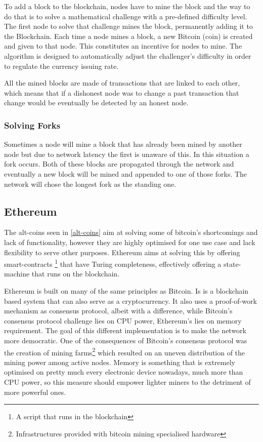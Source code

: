 \documentclass[llncsdoc]{llncs}
\begin{document}
 To add a block to the blockchain, nodes have to mine the block and the way to do that is to solve a mathematical challenge with a pre-defined difficulty level. The first node to solve that challenge mines the block, permanently adding it to the Blockchain. Each time a node mines a block, a new Bitcoin (coin) is created and given to that node. This constitutes an incentive for nodes to mine. The algorithm is designed to automatically adjust the challenger's difficulty in order to regulate the currency issuing rate.
 
 All the mined blocks are made of transactions that are linked to each other, which means that if a dishonest node was to change a past transaction that change would be eventually be detected by an honest node.
 
 
\subsubsection{Solving Forks}
Sometimes a node will mine a block that has already been mined by another node but due to network latency the first is unaware of this. In this situation a fork occurs. Both of these blocks are propagated through the network and eventually a new block will be mined and appended to one of those forks. The network will chose the longest fork as the standing one.

\subsection{Ethereum}
The alt-coins seen in \ref{alt-coins} aim at solving some of bitcoin's shortcomings and lack of functionality, however they are highly optimised for one use case and lack flexibility to serve other purposes. Ethereum aims at solving this by offering smart-contracts \footnote{A script that runs in the blockchain} that have Turing completeness, effectively offering a state-machine that runs on the blockchain.

Ethereum is built on many of the same principles as Bitcoin. Is is a blockchain based system that can also serve as a cryptocurrency. It also uses a proof-of-work mechanism as consensus protocol, albeit with a difference, while Bitcoin's consensus protocol challenge lies on CPU power, Ethereum's lies on memory requirement. The goal of this different implementation is to make the network more democratic. One of the consequences of Bitcoin's consensus protocol was the creation of mining farms\footnote{Infrastructures provided with bitcoin mining specialised hardware} which resulted on an uneven distribution of the mining power among active nodes. Memory is something that is extremely optimised on pretty much every electronic device nowadays, much more than CPU power, so this measure should empower lighter miners to the detriment of more powerful ones.
\end{document}
